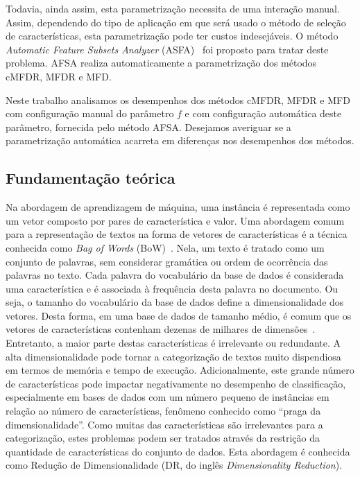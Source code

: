 \documentclass[conference]{IEEEtran}
\begin{document}
Todavia, ainda assim, esta parametrização necessita de uma interação manual. Assim, dependendo do tipo de aplicação em que será usado o método de seleção de características, esta parametrização pode ter custos indesejáveis. O método \textit{Automatic Feature Subsets Analyzer} (ASFA)~\cite{fragoso2016afsa} foi proposto para tratar deste problema. AFSA realiza automaticamente a parametrização dos métodos cMFDR, MFDR e MFD.

Neste trabalho analisamos os desempenhos dos métodos cMFDR, MFDR e MFD com configuração manual do parâmetro $f$ e com configuração automática deste parâmetro, fornecida pelo método AFSA. Desejamos averiguar se a parametrização automática acarreta em diferenças nos desempenhos dos métodos.

\subsection{Fundamentação teórica}
\label{sec:fundamentacao}

Na abordagem de aprendizagem de máquina, uma instância é representada como um vetor composto por pares de característica e valor.
Uma abordagem comum para a representação de textos na forma de vetores de características é a técnica conhecida como \emph{Bag of Words} (BoW)~\cite{guyon2003introduction}. Nela, um texto é tratado como um conjunto de palavras, sem considerar gramática ou ordem de ocorrência das palavras no texto.
Cada palavra do vocabulário da base de dados é considerada uma característica e é associada à frequência desta palavra no documento. Ou seja, o tamanho do vocabulário da base de dados define a dimensionalidade dos vetores.
Desta forma, em uma base de dados de tamanho médio, é comum que os vetores de características contenham dezenas de milhares de dimensões~\cite{gabrilovich2004text}. Entretanto, a maior parte destas características é irrelevante ou redundante. A alta dimensionalidade pode tornar a categorização de textos muito dispendiosa em termos de memória e tempo de execução.
Adicionalmente, este grande número de características pode impactar negativamente no desempenho de classificação, especialmente em bases de dados com um número pequeno de instâncias em relação ao número de características, fenômeno conhecido como ``praga da dimensionalidade''.
Como muitas das características são irrelevantes para a categorização, estes problemas podem ser tratados através da restrição da quantidade de características do conjunto de dados. Esta abordagem é conhecida como Redução de Dimensionalidade (DR, do inglês \emph{Dimensionality Reduction}).
\end{document}
